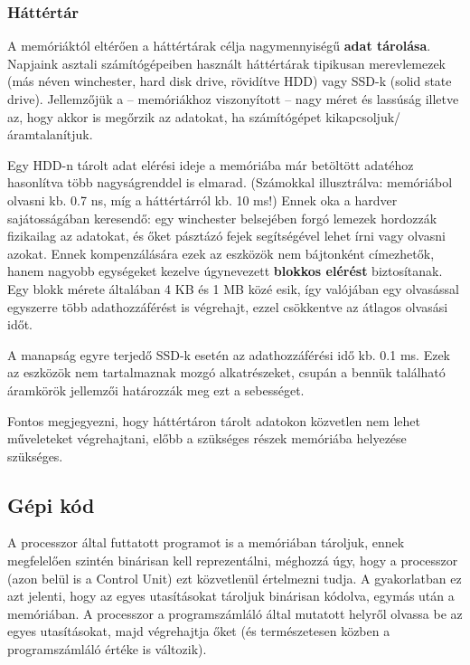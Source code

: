 
\subsubsection{Háttértár}
A memóriáktól eltérően a háttértárak célja nagymennyiségű \textbf{adat tárolása}. Napjaink asztali számítógépeiben használt háttértárak tipikusan merevlemezek (más néven winchester, hard disk drive, rövidítve HDD) vagy SSD-k (solid state drive). Jellemzőjük a -- memóriákhoz viszonyított -- nagy méret és lassúság illetve az, hogy akkor is megőrzik az adatokat, ha számítógépet kikapcsoljuk/áramtalanítjuk. 


Egy HDD-n tárolt adat elérési ideje a memóriába már betöltött adatéhoz hasonlítva több nagyságrenddel is elmarad. (Számokkal illusztrálva: memóriábol olvasni kb. 0.7 ns, míg a háttértárról kb. 10 ms!) Ennek oka a hardver sajátosságában keresendő: egy winchester belsejében forgó lemezek hordozzák fizikailag az adatokat, és őket pásztázó fejek segítségével lehet írni vagy olvasni azokat. Ennek kompenzálására ezek az eszközök nem bájtonként címezhetők, hanem nagyobb egységeket kezelve úgynevezett \textbf{blokkos elérést} biztosítanak. Egy blokk mérete általában 4 KB és 1 MB közé esik, így valójában egy olvasással egyszerre több adathozzáférést is végrehajt, ezzel csökkentve az átlagos olvasási időt.
 
A manapság egyre terjedő SSD-k esetén az adathozzáférési idő kb. 0.1 ms. Ezek az eszközök nem tartalmaznak mozgó alkatrészeket, csupán a bennük található áramkörök jellemzői határozzák meg ezt a sebességet.


Fontos megjegyezni, hogy háttértáron tárolt adatokon közvetlen nem lehet műveleteket végrehajtani, előbb a szükséges részek memóriába helyezése szükséges.


\subsection{Gépi kód} 
A processzor által futtatott programot is a memóriában tároljuk, ennek megfelelően szintén binárisan kell reprezentálni, méghozzá úgy, hogy a processzor (azon belül is a Control Unit) ezt közvetlenül értelmezni tudja. A gyakorlatban ez azt jelenti, hogy az egyes utasításokat tároljuk binárisan kódolva, egymás után a memóriában. A processzor a programszámláló által mutatott helyről olvassa be az egyes utasításokat, majd végrehajtja őket (és természetesen közben a programszámláló értéke is változik). 

